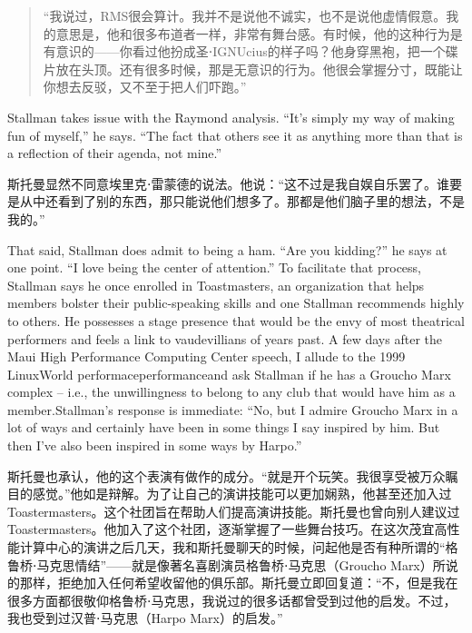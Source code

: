 \ifdefined\chs
\begin{quote}
``我说过，RMS很会算计。我并不是说他不诚实，也不是说他虚情假意。我的意思是，他和很多布道者一样，非常有舞台感。有时候，他的这种行为是有意识的——你看过他扮成圣⋅IGNUcius的样子吗？他身穿黑袍，把一个碟片放在头顶。还有很多时候，那是无意识的行为。他很会掌握分寸，既能让你想去反驳，又不至于把人们吓跑。''
\end{quote}
\fi

\ifdefined\eng
Stallman takes issue with the Raymond analysis. ``It's simply my way of making fun of myself,'' he says. ``The fact that others see it as anything more than that is a reflection of their agenda, not mine.''
\fi

\ifdefined\chs
斯托曼显然不同意埃里克⋅雷蒙德的说法。他说：``这不过是我自娱自乐罢了。谁要是从中还看到了别的东西，那只能说他们想多了。那都是他们脑子里的想法，不是我的。''
\fi

\ifdefined\eng
That said, Stallman does admit to being a ham. ``Are you kidding?'' he says at one point. ``I love being the center of attention.'' To facilitate that process, Stallman says he once enrolled in Toastmasters, an organization that helps members bolster their public-speaking skills and one Stallman recommends highly to others. He possesses a stage presence that would be the envy of most theatrical performers and feels a link to vaudevillians of years past. A few days after the Maui High Performance Computing Center speech, I allude to the 1999 LinuxWorld \ifdefined\vone performace\fi\ifdefined\vtwo performance\fi and ask Stallman if he has a Groucho Marx complex -- i.e., the unwillingness to belong to any club that would have him as a member.\ifdefined\vtwo{}\fi Stallman's response is immediate: ``No, but I admire Groucho Marx in a lot of ways and certainly have been in some things I say inspired by him. But then I've also been inspired in some ways by Harpo.''
\fi

\ifdefined\chs
斯托曼也承认，他的这个表演有做作的成分。``就是开个玩笑。我很享受被万众瞩目的感觉。''他如是辩解。为了让自己的演讲技能可以更加娴熟，他甚至还加入过Toastermasters。这个社团旨在帮助人们提高演讲技能。斯托曼也曾向别人建议过Toastermasters。他加入了这个社团，逐渐掌握了一些舞台技巧。在这次茂宜高性能计算中心的演讲之后几天，我和斯托曼聊天的时候，问起他是否有种所谓的``格鲁桥⋅马克思情结''——就是像著名喜剧演员格鲁桥⋅马克思（Groucho Marx）所说的那样，拒绝加入任何希望收留他的俱乐部\ifdefined\vtwo{}\fi。斯托曼立即回复道：``不，但是我在很多方面都很敬仰格鲁桥⋅马克思，我说过的很多话都曾受到过他的启发。不过，我也受到过汉普⋅马克思（Harpo Marx）的启发。''
\fi

